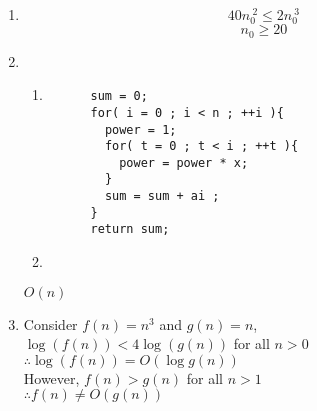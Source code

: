 \documentclass[fleqn,a4paper,12pt]{article}
\begin{document}
\begin{enumerate}
\item
  \[ 40n_0^{\ 2}\leq 2n_0^{\ 3} \]
  \[ n_0 \geq 20 \]

\item
  \begin{enumerate}
  \item
    \begin{lstlisting}
      sum = 0;
      for( i = 0 ; i < n ; ++i ){
        power = 1;
        for( t = 0 ; t < i ; ++t ){
          power = power * x;
        }
        sum = sum + ai ;
      }
      return sum;
    \end{lstlisting}    
  \item
  \end{enumerate}
  $ O(n) $
\item
  
  Consider $f(n)=n^3$ and $g(n)=n$,\\
  $\log (f(n)) < 4 \log (g(n))$ for all $n>0$\\
  $\therefore \log (f(n)) = O(\log g(n))$\\
  However, $f(n) > g(n)$ for all $n>1$\\
  $\therefore f(n) \neq O(g(n))$\\

\end{enumerate}
\end{document}
